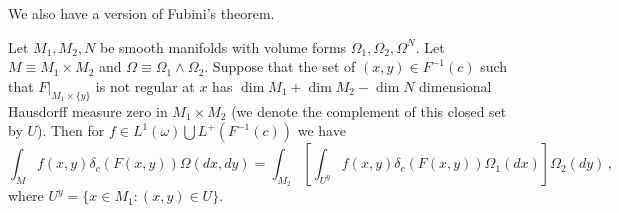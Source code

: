 We also have a version of Fubini's theorem.
\begin{theorem}
Let $M_1,M_2,N$ be smooth manifolds with volume forms $\Omega_1,\Omega_2, \Omega^N$. Let $M\equiv M_1\times M_2$ and $\Omega\equiv \Omega_1\wedge\Omega_2$. Suppose that the set of $(x,y)\in F^{-1}(c)$ such that $F|_{M_1\times\{y\}}$ is not regular at $x$ has $\dim M_1+\dim M_2-\dim N$ dimensional Hausdorff measure zero in $M_1\times M_2$ (we denote the complement of this closed set by $U$).  Then for $f\in L^1(\omega)\bigcup L^+(F^{-1}(c))$ we have
\begin{equation}\label{FubiniEq}
\int_Mf(x,y)\delta_c(F(x,y)) \Omega(dx,dy)=\int_{M_2}\left[\int_{U^y} f(x,y) \delta_c(F(x,y))\Omega_1(dx) \right]\Omega_2(dy)\,,
\end{equation}
where $U^y=\{x\in M_1:(x,y)\in U\}$.
\end{theorem}
